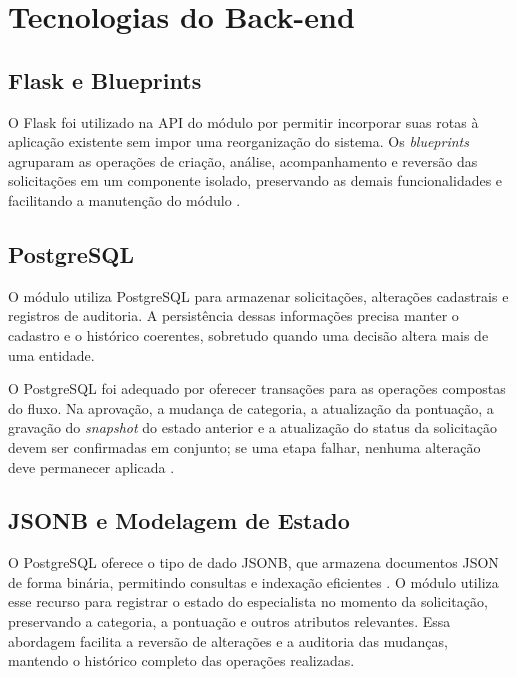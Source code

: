 \section{Tecnologias do Back-end}
\label{sec:tecnologias-backend}

\subsection{Flask e Blueprints}
\label{subsec:flask-blueprints}

O Flask foi utilizado na API do módulo por permitir incorporar suas rotas à aplicação existente
sem impor uma reorganização do sistema. Os \textit{blueprints} agruparam as operações de
criação, análise, acompanhamento e reversão das solicitações em um componente isolado,
preservando as demais funcionalidades e facilitando a manutenção do módulo \cite{flask2024}.

\subsection{PostgreSQL}
\label{subsec:postgresql-transacoes}

O módulo utiliza PostgreSQL para armazenar solicitações, alterações cadastrais e registros de
auditoria. A persistência dessas informações precisa manter o cadastro e o histórico coerentes,
sobretudo quando uma decisão altera mais de uma entidade.

O PostgreSQL foi adequado por oferecer transações para as operações compostas do fluxo. Na
aprovação, a mudança de categoria, a atualização da pontuação, a gravação do \textit{snapshot}
do estado anterior e a atualização do status da solicitação devem ser confirmadas em conjunto;
se uma etapa falhar, nenhuma alteração deve permanecer aplicada \cite{postgresql2024}.

\subsection{JSONB e Modelagem de Estado}
\label{subsec:jsonb}

O PostgreSQL oferece o tipo de dado JSONB, que armazena documentos JSON de forma binária,
permitindo consultas e indexação eficientes \cite{postgresql2024}. O módulo utiliza esse recurso
para registrar o estado do especialista no momento da solicitação, preservando a categoria, a
pontuação e outros atributos relevantes. Essa abordagem facilita a reversão de alterações e a
auditoria das mudanças, mantendo o histórico completo das operações realizadas.

